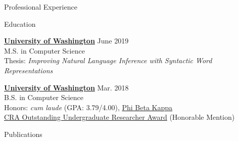 \documentclass{resume}
\begin{document}
\begin{rSection}{Professional Experience}

\end{rSection}

\begin{rSection}{Education}

  {\href{https://www.cs.washington.edu/}
    {\bf University of Washington}} \hfill {June 2019} \\
  M.S. in Computer Science \\
  Thesis: \emph{Improving Natural Language Inference with Syntactic Word Representations}

  \vspace{-0.2em}
  {\href{https://www.cs.washington.edu/}
        {\bf University of Washington}} \hfill {Mar. 2018} \\
  B.S. in Computer Science \\
  Honors: \emph{cum laude} (GPA: 3.79/4.00), \href{https://www.pbk.org/web}
    {Phi Beta Kappa} \\
  \href{https://cra.org/about/awards/outstanding-undergraduate-researcher-award/}
       {CRA Outstanding Undergraduate Researcher Award} (Honorable Mention)


\end{rSection}


\begin{rSection}{Publications}


\end{rSection}
\end{document}
